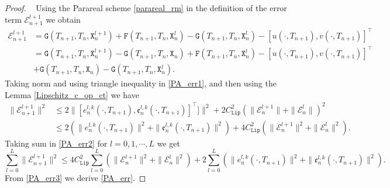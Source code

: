 \documentclass[11pt]{article}
\begin{document}
\begin{proof}~
Using the Parareal scheme \eqref{parareal_rm} in the definition of the error term $\mathcal{E}_{n+1}^{l+1}$ we obtain 
\begin{equation}\label{PA_err1}
\begin{aligned}
\mathcal{E}_{n+1}^{l+1} &= \mathtt{G}(T_{n+1}, T_n, \mathtt{X}_n^{l+1})+\mathtt{F}(T_{n+1}, T_n, \mathtt{X}_n^l)-\mathtt{G}(T_{n+1}, T_n, \mathtt{X}_n^l)- [u(\cdot, T_{n+1}), v(\cdot, T_{n+1})]^{\top}\\
&=\mathtt{G}(T_{n+1}, T_n, \mathtt{X}_n^{l+1}) - \mathtt{G}(T_{n+1}, T_n, \mathtt{X}_n) +\mathtt{F}(T_{n+1}, T_n, \mathtt{X}_n^l)- [u(\cdot, T_{n+1}), v(\cdot, T_{n+1})]^{\top}\\& + \mathtt{G}(T_{n+1}, T_n, \mathtt{X}_n) -\mathtt{G}(T_{n+1}, T_n, \mathtt{X}_n^l).
\end{aligned}
\end{equation}
Taking norm and using triangle inequality in \eqref{PA_err1}, and then using the Lemma \ref{Lipschitz_c_op_ct} we have 
\begin{equation}\label{PA_err2}
\begin{aligned}
\parallel\mathcal{E}_{n+1}^{l+1}\parallel^2 &\leq  2 \parallel [e_n^{l,k}(\cdot, T_{n+1}), \mathfrak{e}_n^{l,k}(\cdot, T_{n+1})]^{\top}] \parallel^2 + 2C_{\texttt{Lip}}^2 \left( \parallel\mathcal{E}_{n}^{l+1}\parallel  + \parallel\mathcal{E}_{n}^{l}\parallel \right)^2\\
&\leq  2 \left( \parallel e_n^{l,k}(\cdot, T_{n+1}) \parallel^2 + \parallel \mathfrak{e}_n^{l,k}(\cdot, T_{n+1}) \parallel^2 \right) + 4C_{\texttt{Lip}}^2 \left( \parallel\mathcal{E}_{n}^{l+1}\parallel^2  + \parallel\mathcal{E}_{n}^{l}\parallel^2 \right).
\end{aligned}
\end{equation}
Taking sum in \eqref{PA_err2} for $l=0,1,\cdots, L$ we get
\begin{equation}\label{PA_err3}
\sum_{l=0}^{L} \parallel \mathcal{E}_{n+1}^{l+1}\parallel^2 \leq 4C_{\texttt{Lip}}^2 \sum_{l=0}^{L} \left( \parallel \mathcal{E}_{n}^{l+1}\parallel^2 +\parallel \mathcal{E}_{n}^{l}\parallel^2\right) + 2 \sum_{l=0}^L \left( \parallel e_n^{l,k}(\cdot, T_{n+1}) \parallel^2 + \parallel \mathfrak{e}_n^{l,k}(\cdot, T_{n+1}) \parallel^2 \right).
\end{equation}
From \eqref{PA_err3} we derive \eqref{PA_err}.
\end{proof}
\end{document}
